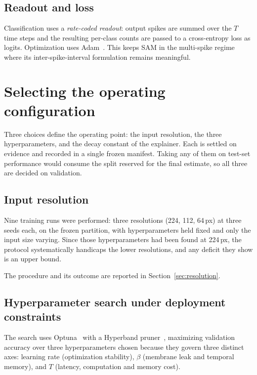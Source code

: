 \subsection{Readout and loss}

Classification uses a \emph{rate-coded readout}: output spikes are summed over
the $T$ time steps and the resulting per-class counts are passed to a
cross-entropy loss as logits. Optimization uses Adam~\cite{kingma2015adam}. This
keeps SAM in the multi-spike regime where its inter-spike-interval formulation
remains meaningful.

\section{Selecting the operating configuration}

Three choices define the operating point: the input resolution, the three
hyperparameters, and the decay constant of the explainer. Each is settled on
evidence and recorded in a single frozen manifest. Taking any of them on test-set
performance would consume the split reserved for the final estimate, so all three
are decided on validation.

\subsection{Input resolution}

Nine training runs were performed: three resolutions (224, 112, 64\,px) at three
seeds each, on the frozen partition, with hyperparameters held fixed and only the
input size varying. Since those hyperparameters had been found at 224\,px, the
protocol systematically handicaps the lower resolutions, and any deficit they
show is an upper bound.

The procedure and its outcome are reported in Section~\ref{sec:resolution}.

\subsection{Hyperparameter search under deployment constraints}

The search uses Optuna~\cite{akiba2019optuna} with a Hyperband
pruner~\cite{li2018hyperband}, maximizing validation accuracy over three
hyperparameters chosen because they govern three distinct axes: learning rate
(optimization stability), $\beta$ (membrane leak and temporal memory), and $T$
(latency, computation and memory cost).

